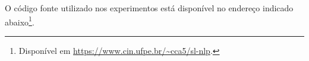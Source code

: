 O código fonte utilizado nos experimentos está disponível no endereço indicado abaixo\footnote{
    Disponível em \url{https://www.cin.ufpe.br/~cca5/sl-nlp}.
}.













    